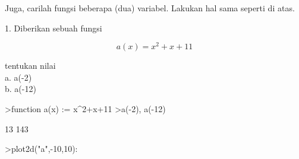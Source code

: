 \documentclass[a4paper,10pt]{article}
\begin{document}
\begin{eulernotebook}
\begin{eulercomment}
\begin{eulercomment}
\begin{eulercomment}
\begin{eulercomment}
\begin{eulercomment}
\begin{eulercomment}
\begin{eulercomment}
\begin{eulercomment}
\begin{eulercomment}
\begin{eulercomment}
\begin{eulercomment}
\begin{eulercomment}
\begin{eulercomment}
\begin{eulercomment}
\begin{eulercomment}
\begin{eulercomment}
\begin{eulercomment}
\begin{eulercomment}
\begin{eulercomment}
\begin{eulercomment}
\begin{eulercomment}
\begin{eulercomment}
\begin{eulercomment}
\begin{eulercomment}
\begin{eulercomment}
\begin{eulercomment}
\begin{eulercomment}
\begin{eulercomment}
\begin{eulercomment}
\begin{eulercomment}
\begin{eulercomment}
\begin{eulercomment}
\begin{eulercomment}
\begin{eulercomment}
\begin{eulercomment}
\begin{eulercomment}
\begin{eulercomment}
\begin{eulercomment}
\begin{eulercomment}
\begin{eulercomment}
\begin{eulercomment}
\begin{eulercomment}
\begin{eulercomment}
\begin{eulercomment}
\begin{eulercomment}
\begin{eulercomment}
\begin{eulercomment}
\begin{eulercomment}
\begin{eulercomment}
\begin{eulercomment}
\begin{eulercomment}
\begin{eulercomment}
\begin{eulercomment}
Juga, carilah fungsi beberapa (dua) variabel. Lakukan hal sama seperti
di atas.

1. Diberikan sebuah fungsi\\
\end{eulercomment}
\begin{eulerformula}
\[
a(x) = x^2+x+11
\]
\end{eulerformula}
\begin{eulercomment}
tentukan nilai\\
a. a(-2)\\
b. a(-12)
\end{eulercomment}
\begin{eulerprompt}
>function a(x) := x^2+x+11
>a(-2), a(-12)
\end{eulerprompt}
\begin{euleroutput}
  13
  143
\end{euleroutput}
\begin{eulerprompt}
>plot2d("a",-10,10):
\end{eulerprompt}
\begin{eulercomment}

\end{eulercomment}
\end{eulercomment}
\end{eulercomment}
\end{eulercomment}
\end{eulercomment}
\end{eulercomment}
\end{eulercomment}
\end{eulercomment}
\end{eulercomment}
\end{eulercomment}
\end{eulercomment}
\end{eulercomment}
\end{eulercomment}
\end{eulercomment}
\end{eulercomment}
\end{eulercomment}
\end{eulercomment}
\end{eulercomment}
\end{eulercomment}
\end{eulercomment}
\end{eulercomment}
\end{eulercomment}
\end{eulercomment}
\end{eulercomment}
\end{eulercomment}
\end{eulercomment}
\end{eulercomment}
\end{eulercomment}
\end{eulercomment}
\end{eulercomment}
\end{eulercomment}
\end{eulercomment}
\end{eulercomment}
\end{eulercomment}
\end{eulercomment}
\end{eulercomment}
\end{eulercomment}
\end{eulercomment}
\end{eulercomment}
\end{eulercomment}
\end{eulercomment}
\end{eulercomment}
\end{eulercomment}
\end{eulercomment}
\end{eulercomment}
\end{eulercomment}
\end{eulercomment}
\end{eulercomment}
\end{eulercomment}
\end{eulercomment}
\end{eulercomment}
\end{eulercomment}
\end{eulercomment}
\end{eulernotebook}
\end{document}
